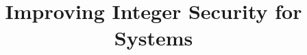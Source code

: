 \documentclass[10pt,letterpaper,twocolumn]{article}
\begin{document}
\title{Improving Integer Security for Systems}
\author{}
\date{}
\maketitle







%






\end{document}
